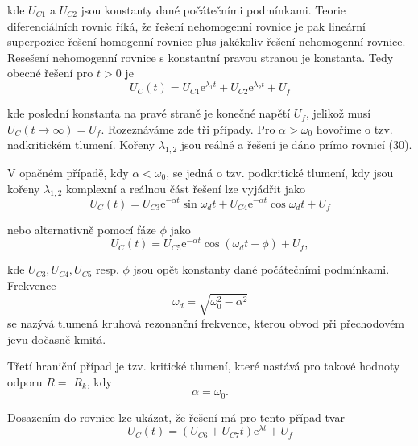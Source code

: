 \documentclass[czech,11pt,a4paper]{article}
\begin{document}
\begin{multicols}{2}
		kde $U_{C 1}$ a $U_{C 2}$ jsou konstanty dané počátečními podmínkami. Teorie diferenciálních rovnic říká, že řešení nehomogenní rovnice je pak lineární superpozice řešení homogenní rovnice plus jakékoliv řešení nehomogenní rovnice. Resešení nehomogenní rovnice s konstantní pravou stranou je konstanta. Tedy obecné řešení pro $t>0$ je
\begin{equation}
			U_{C}(t)=U_{C 1} \mathrm{e}^{\lambda_{1} t}+U_{C 2} \mathrm{e}^{\lambda_{2} t}+U_{f}
\end{equation}
		
		kde poslední konstanta na pravé straně je konečné napětí $U_{f}$, jelikož musí $U_{C}(t \rightarrow \infty)=U_{f}$.
		Rozeznáváme zde tři případy. Pro $\alpha>\omega_{0}$ hovoříme o tzv. nadkritickém tlumení. Kořeny $\lambda_{1,2}$  jsou reálné a řešení je dáno prímo rovnicí (30).
		
		V opačném případě, kdy $\alpha<\omega_{0}$, se jedná o tzv. podkritické tlumení, kdy jsou kořeny $\lambda_{1,2}$ komplexní a reálnou část řešení lze vyjádřit jako
\begin{equation}
			U_{C}(t)=U_{C 3} \mathrm{e}^{-\alpha t} \sin \omega_{d} t+U_{C 4} \mathrm{e}^{-\alpha t} \cos \omega_{d} t+U_{f}
\end{equation}
		
		nebo alternativně pomocí fáze $\phi$ jako
\begin{equation}
			U_{C}(t)=U_{C 5} \mathrm{e}^{-\alpha t} \cos \left(\omega_{d} t+\phi\right)+U_{f},
\end{equation}
		
		kde $U_{C 3}, U_{C 4}, U_{C 5}$ resp. $\phi$ jsou opĕt konstanty dané počátečními podmínkami. Frekvence
\begin{equation}
			\omega_{d}=\sqrt{\omega_{0}^{2}-\alpha^{2}}
\end{equation}
		se nazývá tlumená kruhová rezonanční frekvence, kterou obvod při přechodovém jevu dočasně kmitá.
		
		Třetí hraniční případ je tzv. kritické tlumení, které nastává pro takové hodnoty odporu $R=$ $R_{k}$, kdy
\begin{equation}
			\alpha=\omega_{0} .
\end{equation}
		
		
		Dosazením do rovnice lze ukázat, že řešení má pro tento případ tvar
\begin{equation}
			U_{C}(t)=\left(U_{C 6}+U_{C 7} t\right) \mathrm{e}^{\lambda t}+U_{f}
\end{equation}
		

\end{multicols}
\end{document}
